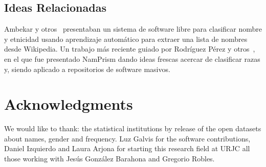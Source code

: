 \documentclass[a4paper]{article}
\begin{document}
\subsection{Ideas Relacionadas}

Ambekar y otros~\cite{ambekar2009name} presentaban un sistema de
software libre para clasificar nombre y etnicidad usando aprendizaje
automático para extraer una lista de nombres desde Wikipedia.
Un trabajo más reciente guiado por Rodríguez Pérez y
otros~\cite{nadri2021relationship}, en el que fue presentado
NamPrism dando ideas frescas acercar de clasificar razas y,
siendo aplicado a repositorios de software masivos.



\section*{Acknowledgments}

We would like to thank: the statistical institutions by
release of the open datasets about names, gender and frequency.
Luz Galvis for the software contributions, Daniel Izquierdo and
Laura Arjona for starting this research field at URJC all those
working with Jesús González Barahona and Gregorio Robles. 



\end{document}
